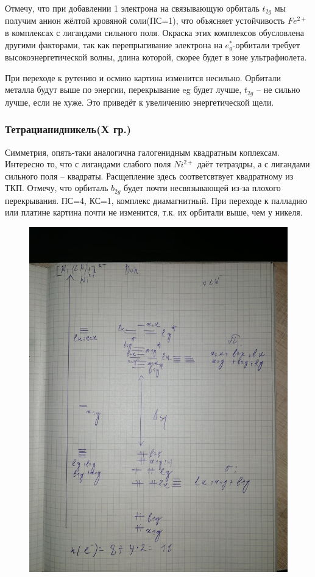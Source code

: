 Отмечу, что при добавлении 1 электрона на связывающую орбиталь $t_{2g}$ мы получим анион жёлтой кровяной соли(ПС=1), что объясняет устойчивость $Fe^{2+}$ в комплексах с лигандами сильного поля. Окраска этих комплексов обусловлена другими факторами, так как перепрыгивание электрона на $e_g^*$-орбитали требует высокоэнергетической волны, длина которой, скорее будет в зоне ультрафиолета.

При переходе к рутению и осмию картина изменится несильно. Орбитали металла будут выше по энергии, перекрывание eg будет лучше, $t_{2g}$ – не сильно лучше, если не хуже. Это приведёт к увеличению энергетической щели.

\subsubsection*{Тетрацианидникель(X гр.)}
  
	Симметрия, опять-таки аналогична галогенидным квадратным коплексам. Интересно то, что с лигандами слабого поля $Ni^{2+}$ даёт тетраэдры, а с лигандами сильного поля – квадраты. Расщепление здесь соответсвтвует квадратному из ТКП. Отмечу, что орбиталь $b_{2g}$ будет  почти несвязывающей из-за плохого перекрывания. ПС=4, КС=1, комплекс диамагнитный. При переходе к палладию или платине картина почти не изменится, т.к. их орбитали выше, чем у никеля.
	
\begin{figure}[H]
\centering
\includegraphics[scale=.300]{images/cyanides2.jpg}
\end{figure}
	